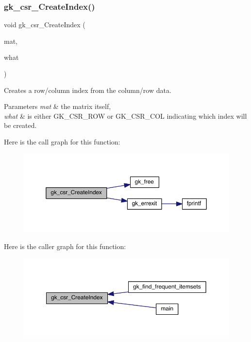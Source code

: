\subsubsection{\texorpdfstring{gk\+\_\+csr\+\_\+\+Create\+Index()}{gk\_csr\_CreateIndex()}}
{\footnotesize\ttfamily void gk\+\_\+csr\+\_\+\+Create\+Index (\begin{DoxyParamCaption}\item[{\hyperlink{a00634}{gk\+\_\+csr\+\_\+t} $\ast$}]{mat,  }\item[{int}]{what }\end{DoxyParamCaption})}

Creates a row/column index from the column/row data. 
\begin{DoxyParams}{Parameters}
{\em mat} & the matrix itself, \\
\hline
{\em what} & is either G\+K\+\_\+\+C\+S\+R\+\_\+\+R\+OW or G\+K\+\_\+\+C\+S\+R\+\_\+\+C\+OL indicating which index will be created. \\
\hline
\end{DoxyParams}
Here is the call graph for this function\+:\nopagebreak
\begin{figure}[H]
\begin{center}
\leavevmode
\includegraphics[width=350pt]{a00077_a8bdd383ab80fe76507463f59c3d2863a_cgraph}
\end{center}
\end{figure}
Here is the caller graph for this function\+:\nopagebreak
\begin{figure}[H]
\begin{center}
\leavevmode
\includegraphics[width=350pt]{a00077_a8bdd383ab80fe76507463f59c3d2863a_icgraph}
\end{center}
\end{figure}
\mbox{\label{a00077_a24144cf4c30d5ec4ed8b488d371476b3}} 
